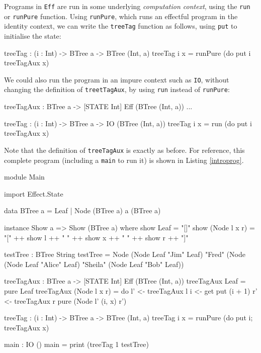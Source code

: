 Programs in \texttt{Eff} are run in some underlying \emph{computation context},
using the \texttt{run} or \texttt{runPure} function. Using 
\texttt{runPure}, which runs an effectful program in the identity context,
we can write the \texttt{treeTag} function as follows, using \texttt{put}
to initialise the state:

\begin{code}
treeTag : (i : Int) -> BTree a -> BTree (Int, a)
treeTag i x = runPure (do put i
                          treeTagAux x)
\end{code}

\noindent
We could also run the program in an impure context such as \texttt{IO},
without changing the definition of \texttt{treetTagAux},
by using \texttt{run} instead of \texttt{runPure}:

\begin{code}
treeTagAux : BTree a -> { [STATE Int] } Eff (BTree (Int, a))
...

treeTag : (i : Int) -> BTree a -> IO (BTree (Int, a))
treeTag i x = run (do put i
                      treeTagAux x)
\end{code}

\noindent
Note that the definition of \texttt{treeTagAux} is exactly as before. 
For reference, this
complete program (including a \texttt{main} to run it) is shown in
Listing \ref{introprog}.

\begin{code}[float=h,frame=single, caption={Tree tagging}, label=introprog]
module Main

import Effect.State

data BTree a = Leaf
             | Node (BTree a) a (BTree a)

instance Show a => Show (BTree a) where
    show Leaf = "[]"
    show (Node l x r) = "[" ++ show l ++ " "
                            ++ show x ++ " "
                            ++ show r ++ "]"

testTree : BTree String
testTree = Node (Node Leaf "Jim" Leaf)
              "Fred"
              (Node (Node Leaf "Alice" Leaf)
                    "Sheila"
                    (Node Leaf "Bob" Leaf))

treeTagAux : BTree a -> { [STATE Int] } Eff (BTree (Int, a))
treeTagAux Leaf = pure Leaf
treeTagAux (Node l x r) = do l' <- treeTagAux l
                             i <- get
                             put (i + 1)
                             r' <- treeTagAux r
                             pure (Node l' (i, x) r')

treeTag : (i : Int) -> BTree a -> BTree (Int, a)
treeTag i x = runPure (do put i; treeTagAux x)

main : IO () 
main = print (treeTag 1 testTree) 
\end{code}


